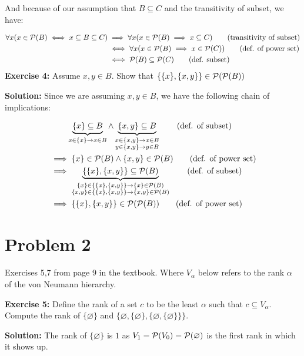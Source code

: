 \documentclass{article}
\begin{document}
And because of our assumption that $B\subseteq C$ and the transitivity of subset, we have:

\begin{align*}
    \forall x(x\in\mathcal P(B)\iff x\subseteq B\subseteq C)&\implies\forall x(x\in\mathcal P(B)\implies x\subseteq C)\tag{transitivity of subset}\\
    &\iff\forall x(x\in\mathcal P(B)\implies x\in\mathcal P(C))\tag{def. of power set}\\
    &\iff\mathcal P(B)\subseteq\mathcal P(C)\tag{def. subset}
\end{align*}
\bigskip
\noindent\textbf{Exercise 4:} Assume $x,y\in B$. Show that $\{\{x\},\{x,y\}\}\in\mathcal P(\mathcal P(B))$
\bigskip

\noindent\textbf{Solution:} Since we are assuming $x,y\in B$, we have the following chain of implications:

\begin{align*}
    &\phantom{\implies}\underbrace{\{x\}\subseteq B}_{x\in\{x\}\rightarrow x\in B} \wedge\underbrace{\{x,y\}\subseteq B}_{\substack{x\in\{x,y\}\rightarrow x\in B\\y\in\{x,y\}\rightarrow y\in B}}\tag{def. of subset}\\
    &\implies \{x\}\in\mathcal P(B)\wedge\{x,y\}\in\mathcal P(B)\tag{def. of power set}\\
    &\implies \underbrace{\{\{x\},\{x,y\}\}\subseteq \mathcal P(B)}_{\substack{\{x\}\in\{\{x\},\{x,y\}\}\rightarrow \{x\}\in\mathcal P(B)\\\{x,y\}\in\{\{x\},\{x,y\}\}\rightarrow \{x,y\}\in\mathcal P(B)}}\tag{def. of subset}\\
    &\implies\{\{x\},\{x,y\}\}\in\mathcal P(\mathcal P(B))\tag{def. of power set}
\end{align*}

\section*{Problem 2}
Exercises 5,7 from page 9 in the textbook. Where $V_\alpha$ below refers to the rank $\alpha$ of the von Neumann hierarchy.
\bigskip

\noindent\textbf{Exercise 5:} Define the rank of a set $c$ to be the least $\alpha$ such that $c\subseteq V_\alpha$. Compute the rank of $\{\varnothing\}$ and $\{\varnothing, \{\varnothing\}, \{\varnothing, \{\varnothing\}\}\}$.
\bigskip

\noindent\textbf{Solution:} The rank of $\{\varnothing\}$ is $1$ as $V_1=\mathcal P(V_0)=\mathcal P(\varnothing)$ is the first rank in which it shows up.
\end{document}
